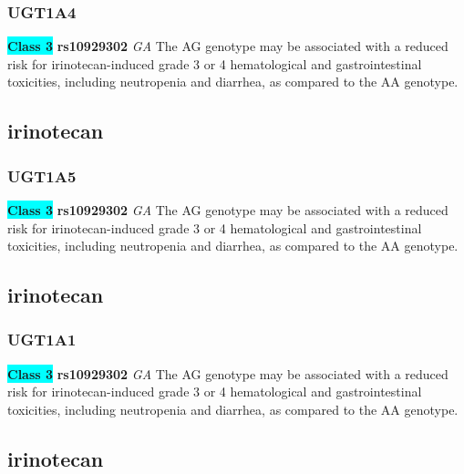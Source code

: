 \documentclass{book}
\begin{document}
\subsubsection{ UGT1A4 }

\begin{center}
\textbf{\colorbox{cyan} {Class 3}} \textbf{ rs10929302 } \textit{ GA }
The AG genotype may be associated with a reduced risk for irinotecan-induced grade 3 or 4 hematological and gastrointestinal toxicities, including neutropenia and diarrhea, as compared to the AA genotype. 


\end{center}\subsection{ irinotecan }


\subsubsection{ UGT1A5 }

\begin{center}
\textbf{\colorbox{cyan} {Class 3}} \textbf{ rs10929302 } \textit{ GA }
The AG genotype may be associated with a reduced risk for irinotecan-induced grade 3 or 4 hematological and gastrointestinal toxicities, including neutropenia and diarrhea, as compared to the AA genotype. 


\end{center}\subsection{ irinotecan }


\subsubsection{ UGT1A1 }

\begin{center}
\textbf{\colorbox{cyan} {Class 3}} \textbf{ rs10929302 } \textit{ GA }
The AG genotype may be associated with a reduced risk for irinotecan-induced grade 3 or 4 hematological and gastrointestinal toxicities, including neutropenia and diarrhea, as compared to the AA genotype. 


\end{center}\subsection{ irinotecan }
\end{document}
